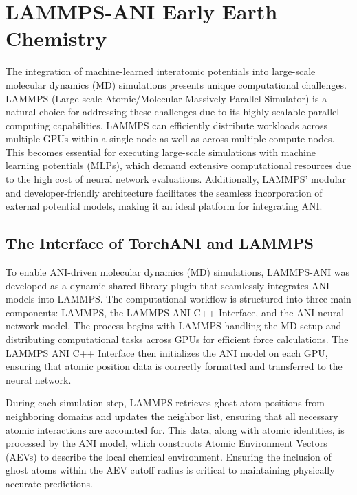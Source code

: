 \chapter{LAMMPS-ANI Early Earth Chemistry} 
\label{chapter4}

The integration of machine-learned interatomic potentials into large-scale molecular dynamics (MD) simulations presents unique computational challenges. LAMMPS (Large-scale Atomic/Molecular Massively Parallel Simulator) \cite{lammps} is a natural choice for addressing these challenges due to its highly scalable parallel computing capabilities. LAMMPS can efficiently distribute workloads across multiple GPUs within a single node as well as across multiple compute nodes. This becomes essential for executing large-scale simulations with machine learning potentials (MLPs), which demand extensive computational resources due to the high cost of neural network evaluations. Additionally, LAMMPS’ modular and developer-friendly architecture facilitates the seamless incorporation of external potential models, making it an ideal platform for integrating ANI.

\section{The Interface of TorchANI and LAMMPS}
\label{sec:lammps-ani}

To enable ANI-driven molecular dynamics (MD) simulations, LAMMPS-ANI was developed as a dynamic shared library plugin that seamlessly integrates ANI models into LAMMPS. The computational workflow is structured into three main components: LAMMPS, the LAMMPS ANI C++ Interface, and the ANI neural network model. The process begins with LAMMPS handling the MD setup and distributing computational tasks across GPUs for efficient force calculations. The LAMMPS ANI C++ Interface then initializes the ANI model on each GPU, ensuring that atomic position data is correctly formatted and transferred to the neural network.

During each simulation step, LAMMPS retrieves ghost atom positions from neighboring domains and updates the neighbor list, ensuring that all necessary atomic interactions are accounted for. This data, along with atomic identities, is processed by the ANI model, which constructs Atomic Environment Vectors (AEVs) to describe the local chemical environment. Ensuring the inclusion of ghost atoms within the AEV cutoff radius is critical to maintaining physically accurate predictions.

